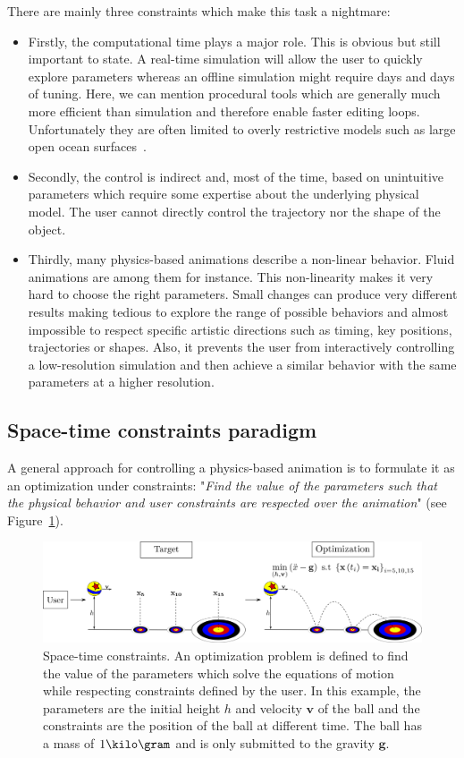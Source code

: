 There are mainly three constraints which make this task a nightmare:
\begin{itemize}
	\item Firstly, the computational time plays a major role. 
	This is obvious but still important to state. 
	A real-time simulation will allow the user to quickly explore parameters whereas an offline simulation might require days and days of tuning.
    Here, we can mention procedural tools which are generally much more efficient than simulation and therefore enable faster editing loops. Unfortunately they are often limited to overly restrictive models such as large open ocean surfaces~\cite{hinsinger2002,Tessendorf2004,jeschke2015water,horvath2015empirical}.
	\item Secondly, the control is indirect and, most of the time, based on unintuitive parameters which require some expertise about the underlying physical model. The user cannot directly control the trajectory nor the shape of the object.
	\item Thirdly, many physics-based animations describe a non-linear behavior. Fluid animations are among them for instance. 
	This non-linearity makes it very hard to choose the right parameters. 
	Small changes can produce very different results making tedious to explore the range of possible behaviors and almost impossible to respect specific artistic directions such as timing, key positions, trajectories or shapes. 
	Also, it prevents the user from interactively controlling a low-resolution simulation and then achieve a similar behavior with the same parameters at a higher resolution.
\end{itemize}

\subsection{Space-time constraints paradigm}
A general approach for controlling a physics-based animation is to formulate it as an optimization under constraints: 
"\emph{Find the value of the parameters such that the physical behavior and user constraints are respected over the animation}" 
(see Figure~\ref{fig:spaceTimeConstraints}).
\begin{figure}[!h]
\centering
\includegraphics[width=\linewidth]{./images/simulationControl/spaceTimeConstraints.png}
\caption[STAR control: Space-time constraints]{\label{fig:spaceTimeConstraints} Space-time constraints. 
An optimization problem is defined to find the value of the parameters which solve the equations of motion while respecting constraints defined by the user.
In this example, the parameters are the initial height $h$ and velocity $\mathbf{v}$ of the ball and the constraints are the position of the ball at different time.
The ball has a mass of $1 \kilo\gram$ and is only submitted to the gravity $\mathbf{g}$.}
\end{figure}

